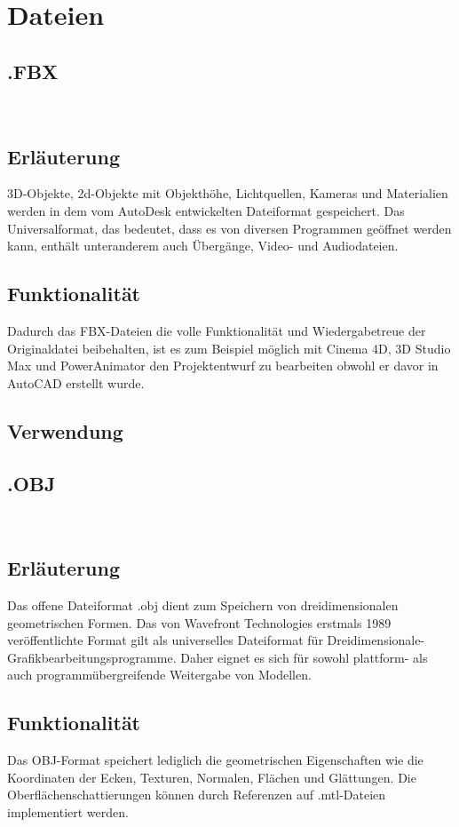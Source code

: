\chapter{Dateien}

\section{.FBX}
~\cite{FBX_01} ~\cite{FBX_02}
\section*{Erläuterung}
3D-Objekte, 2d-Objekte mit Objekthöhe, Lichtquellen, Kameras und Materialien werden in dem vom AutoDesk entwickelten Dateiformat gespeichert. Das Universalformat, das bedeutet, dass es von diversen Programmen geöffnet werden kann, enthält unteranderem auch Übergänge, Video- und Audiodateien. 

\section*{Funktionalität}
Dadurch das FBX-Dateien die volle Funktionalität und Wiedergabetreue der Originaldatei beibehalten, ist es zum Beispiel möglich mit Cinema 4D, 3D Studio Max und PowerAnimator den Projektentwurf zu bearbeiten obwohl er davor in AutoCAD erstellt wurde. 

\section*{Verwendung}

\clearpage
\newpage

\section{.OBJ}
~\cite{OBJ_01}~\cite{OBJ_02}
\section*{Erläuterung}
Das offene Dateiformat .obj dient zum Speichern von dreidimensionalen geometrischen Formen. Das von Wavefront Technologies erstmals 1989 veröffentlichte Format gilt als universelles Dateiformat für Dreidimensionale-Grafikbearbeitungsprogramme. Daher eignet es sich für sowohl plattform- als auch programmübergreifende Weitergabe von Modellen.

\section*{Funktionalität}
Das OBJ-Format speichert lediglich die geometrischen Eigenschaften wie die Koordinaten der Ecken, Texturen, Normalen, Flächen und Glättungen. Die Oberflächenschattierungen können durch Referenzen auf .mtl-Dateien implementiert werden.

